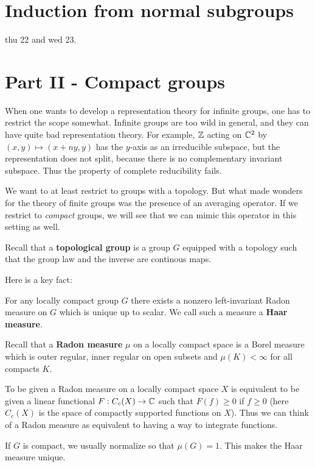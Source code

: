 \documentclass[11pt, english]{article}
\begin{document}
\newpage
\section{Induction from normal subgroups}

thu 22 and wed 23.


\newpage
\section{Part II - Compact groups}

When one wants to develop a representation theory for infinite groups, one has to restrict the scope somewhat. Infinite groups are too wild in general, and they can have quite bad representation theory. For example, $\mathbb{Z}$ acting on $\mathbb{C}^2$ by $(x,y) \mapsto (x+ny,y)$ has the $y$-axis as an irreducible subspace, but the representation does not split, because there is no complementary invariant subspace. Thus the property of complete reducibility fails. 

We want to at least restrict to groups with a topology. But what made wonders for the theory of finite groups was the presence of an averaging operator. If we restrict to \emph{compact} groups, we will see that we can mimic this operator in this setting as well.

Recall that a \textbf{topological group} is a group $G$ equipped with a topology such that the group law and the inverse are continous maps. 

Here is a key fact:
\begin{prop}
For any locally compact group $G$ there exists a nonzero left-invariant Radon measure on $G$ which is unique up to scalar. We call such a measure a \textbf{Haar measure}.  
\end{prop}

Recall that a \textbf{Radon measure} $\mu$ on a locally compact space is a Borel measure which is outer regular, inner regular on open subsets and $\mu(K) < \infty$ for all compacts $K$.

To be given a Radon measure on a locally compact space $X$ is equivalent to be given a linear functional $F:C_c(X) \to \mathbb{C}$ such that $F(f) \geq 0$ if $f \geq 0$ (here $C_c(X)$ is the space of compactly supported functions on $X$). Thus we can think of a Radon measure as equivalent to having a way to integrate functions.

If $G$ is compact, we usually normalize so that $\mu(G)=1$. This makes the Haar measure unique.
\end{document}
